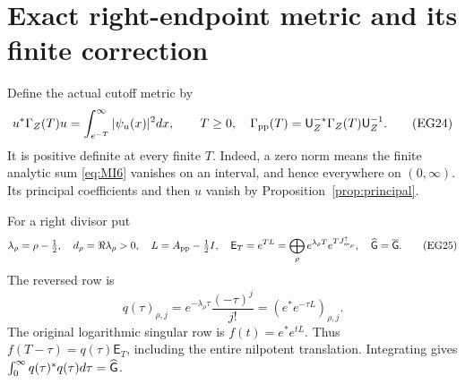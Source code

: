 \documentclass[11pt]{article}
\newcommand{\U}{\mathsf U}\newcommand{\E}{\mathsf E}
\begin{document}
\section{Exact right-endpoint metric and its finite correction}\label{sec:right-endpoint}
Define the actual cutoff metric by
\[
 u^*\Gamma_Z(T)u=\int_{e^{-T}}^\infty|\psi_u(x)|^2dx,
 \qquad T\ge0,\quad \Gamma_{\rm pp}(T)=\U_Z^{-*}\Gamma_Z(T)\U_Z^{-1}.
 \tag{EG24}\label{eq:cutoff}
\]
It is positive definite at every finite $T$. Indeed, a zero norm
means the finite analytic sum \eqref{eq:MI6} vanishes on an interval,
and hence everywhere on $(0,\infty)$. Its principal coefficients
and then $u$ vanish by Proposition~\ref{prop:principal}.

For a right divisor put
\[
 \lambda_\rho=\rho-\tfrac12,\quad d_\rho=\Re\lambda_\rho>0,
 \quad L=A_{\rm pp}-\tfrac12I,\quad
 \E_T=e^{TL}=\bigoplus_\rho e^{\lambda_\rho T}e^{TJ^\uparrow_{m_\rho}},
 \quad\widehat\G=\overline\G.
 \tag{EG25}\label{eq:E}
\]
The reversed row is
\[
 q(\tau)_{\rho,j}=e^{-\lambda_\rho\tau}\frac{(-\tau)^j}{j!}
                      = (e^*e^{-\tau L})_{\rho,j}.
 \tag{EG26}\label{eq:q}
\]
The original logarithmic singular row is $f(t)=e^*e^{tL}$.
Thus $f(T-\tau)=q(\tau)\E_T$, including the entire nilpotent
translation. Integrating gives
$\int_0^\infty q(\tau)^*q(\tau)d\tau=\widehat{\mathsf G}$.
\end{document}
